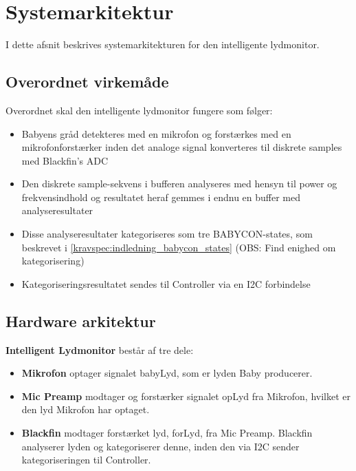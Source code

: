 \section{Systemarkitektur}

I dette afsnit beskrives systemarkitekturen for den intelligente lydmonitor.

\subsection*{Overordnet virkemåde}
Overordnet skal den intelligente lydmonitor fungere som følger:
\begin{itemize}
	\item Babyens gråd detekteres med en mikrofon og forstærkes med en mikrofonforstærker inden det analoge signal konverteres til diskrete samples med Blackfin's ADC
	\item Den diskrete sample-sekvens i bufferen analyseres med hensyn til power og frekvensindhold og resultatet heraf gemmes i endnu en buffer med analyseresultater
	\item Disse analyseresultater kategoriseres som tre BABYCON-states, som beskrevet i \ref{kravspec:indledning_babycon_states} (OBS: Find enighed om kategorisering)
	\item Kategoriseringsresultatet sendes til Controller via en I2C forbindelse
\end{itemize}


\newpage
\subsection{Hardware arkitektur}

\textbf{Intelligent Lydmonitor} består af tre dele: 
\begin{itemize}
\item \textbf{Mikrofon} optager signalet babyLyd, som er lyden Baby producerer. 
\item \textbf{Mic Preamp} modtager og forstærker signalet opLyd fra Mikrofon, hvilket er den lyd Mikrofon har optaget. 
\item \textbf{Blackfin} modtager forstærket lyd, forLyd, fra Mic Preamp. Blackfin analyserer lyden og kategoriserer denne, inden den via I2C sender kategoriseringen til Controller. 
\end{itemize}

